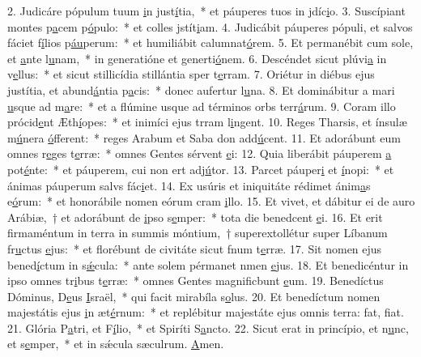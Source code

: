2. Judicáre pópulum tuum \uline{i}n just\uline{í}tia,~* et páuperes tuos in jdíc\uline{i}o.
3. Suscípiant montes p\uline{a}cem p\uline{ó}pulo:~* et colles jstít\uline{i}am.
4. Judicábit páuperes pópuli, et salvos fáciet f\uline{í}lios p\uline{áu}perum:~* et humiliábit calumnat\uline{ó}rem.
5. Et permanébit cum sole, et \uline{a}nte l\uline{u}nam,~* in generatióne et generti\uline{ó}nem.
6. Descéndet sicut plúvi\uline{a} in v\uline{e}llus:~* et sicut stillicídia stillántia sper t\uline{e}rram.
7. Oriétur in diébus ejus justítia, et abund\uline{á}ntia p\uline{a}cis:~* donec aufertur l\uline{u}na.
8. Et dominábitur a mari \uline{u}sque ad m\uline{a}re:~* et a flúmine usque ad términos orbs terr\uline{á}rum.
9. Coram illo prócid\uline{e}nt Æth\uline{í}opes:~* et inimíci ejus trram l\uline{i}ngent.
10. Reges Tharsis, et ínsulæ m\uline{ú}nera \uline{ó}fferent:~* reges Arabum et Saba don add\uline{ú}cent.
11. Et adorábunt eum omnes r\uline{e}ges t\uline{e}rræ:~* omnes Gentes sérvent \uline{e}i:
12. Quia liberábit páuperem \uline{a} pot\uline{é}nte:~* et páuperem, cui non ert adj\uline{ú}tor.
13. Parcet páuper\uline{i} et \uline{í}nopi:~* et ánimas páuperum salvs fác\uline{i}et.
14. Ex usúris et iniquitáte rédimet ánim\uline{a}s e\uline{ó}rum:~* et honorábile nomen eórum cram \uline{i}llo.
15. Et vivet, et dábitur ei de auro Arábiæ,~† et adorábunt de \uline{i}pso s\uline{e}mper:~* tota die benedcent \uline{e}i.
16. Et erit firmaméntum in terra in summis móntium,~† superextollétur super Líbanum fr\uline{u}ctus \uline{e}jus:~* et florébunt de civitáte sicut fnum t\uline{e}rræ.
17. Sit nomen ejus bened\uline{í}ctum in s\uline{ǽ}cula:~* ante solem pérmanet nmen \uline{e}jus.
18. Et benedicéntur in ipso omnes tr\uline{i}bus t\uline{e}rræ:~* omnes Gentes magnificbunt \uline{e}um.
19. Benedíctus Dóminus, D\uline{e}us \uline{I}sraël,~* qui facit mirabíla s\uline{o}lus.
20. Et benedíctum nomen majestátis ejus \uline{i}n æt\uline{é}rnum:~* et replébitur majestáte ejus omnis terra: fat, f\uline{i}at.
21. Glória P\uline{a}tri, et F\uline{í}lio,~* et Spiríti S\uline{a}ncto.
22. Sicut erat in princípio, et n\uline{u}nc, et s\uline{e}mper,~* et in sǽcula sæculrum. \uline{A}men.
